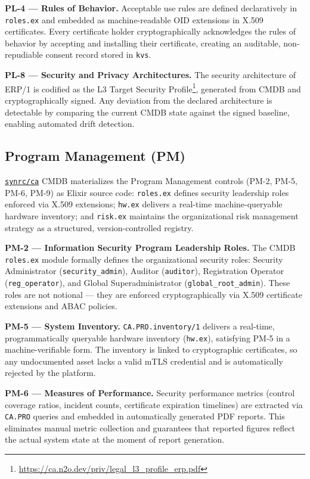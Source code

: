 \documentclass{article}
\begin{document}
\textbf{PL-4 --- Rules of Behavior.}
Acceptable use rules are defined declaratively in \texttt{roles.ex} and embedded as machine-readable OID extensions in X.509 certificates. Every certificate holder cryptographically acknowledges the rules of behavior by accepting and installing their certificate, creating an auditable, non-repudiable consent record stored in \texttt{kvs}.

\textbf{PL-8 --- Security and Privacy Architectures.}
The security architecture of ERP/1 is codified as the L3 Target Security Profile\footnote{\url{https://ca.n2o.dev/priv/legal_l3_profile_erp.pdf}}, generated from CMDB and cryptographically signed. Any deviation from the declared architecture is detectable by comparing the current CMDB state against the signed baseline, enabling automated drift detection.

\subsection{Program Management (PM)}

\href{https://github.com/synrc/ca}{\texttt{synrc/ca}} CMDB materializes the Program Management controls (PM-2, PM-5, PM-6, PM-9) as Elixir source code: \texttt{roles.ex} defines security leadership roles enforced via X.509 extensions; \texttt{hw.ex} delivers a real-time machine-queryable hardware inventory; and \texttt{risk.ex} maintains the organizational risk management strategy as a structured, version-controlled registry.

\textbf{PM-2 --- Information Security Program Leadership Roles.}
The CMDB \texttt{roles.ex} module formally defines the organizational security roles: Security Administrator (\texttt{security\_admin}), Auditor (\texttt{auditor}), Registration Operator (\texttt{reg\_operator}), and Global Superadministrator (\texttt{global\_root\_admin}). These roles are not notional --- they are enforced cryptographically via X.509 certificate extensions and ABAC policies.

\textbf{PM-5 --- System Inventory.}
\texttt{CA.PRO.inventory/1} delivers a real-time, programmatically queryable hardware inventory (\texttt{hw.ex}), satisfying PM-5 in a machine-verifiable form. The inventory is linked to cryptographic certificates, so any undocumented asset lacks a valid mTLS credential and is automatically rejected by the platform.

\textbf{PM-6 --- Measures of Performance.}
Security performance metrics (control coverage ratios, incident counts, certificate expiration timelines) are extracted via \texttt{CA.PRO} queries and embedded in automatically generated PDF reports. This eliminates manual metric collection and guarantees that reported figures reflect the actual system state at the moment of report generation.
\end{document}
